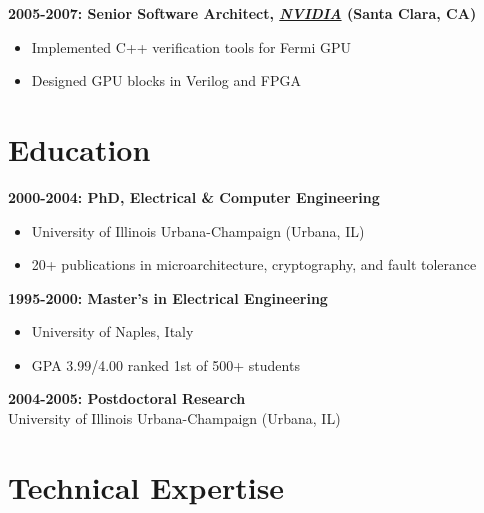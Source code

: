 \documentclass[10pt, letterpaper]{article}
\providecommand{\tightlist}{%
\setlength{\itemsep}{0pt}
\setlength{\parskip}{0pt}}
\begin{document}
  \textbf{2005-2007: Senior Software Architect,
  \href{https://www.nvidia.com/en-us/}{\emph{NVIDIA}} (Santa Clara, CA)}

  \begin{itemize}
    \tightlist

    \item Implemented C++ verification tools for Fermi GPU

    \item Designed GPU blocks in Verilog and FPGA
  \end{itemize}

  \section{\texorpdfstring{\textbf{Education}}{Education}}
  \label{education}

  \textbf{2000-2004: PhD, Electrical \& Computer Engineering} \\
  \begin{itemize}
    \tightlist

    \item University of Illinois Urbana-Champaign (Urbana, IL)

    \item 20+ publications in microarchitecture, cryptography, and fault
      tolerance
  \end{itemize}

  \textbf{1995-2000: Master's in Electrical Engineering} \\
  \begin{itemize}
    \tightlist

    \item University of Naples, Italy

    \item GPA 3.99/4.00 ranked 1st of 500+ students
  \end{itemize}

  \textbf{2004-2005: Postdoctoral Research} \\ University of Illinois
  Urbana-Champaign (Urbana, IL)

  \section{\texorpdfstring{\textbf{Technical Expertise}}{Technical
  Expertise}}
  \label{technical-expertise}
\end{document}
